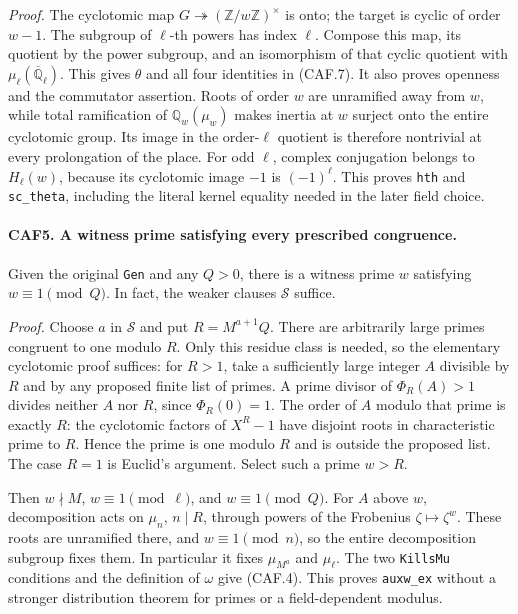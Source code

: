 \documentclass[11pt,a4paper]{article}
\numberwithin{equation}{section}
\theoremstyle{remark}\newtheorem{remark}[theorem]{Remark}
\begin{document}
\emph{Proof.}
The cyclotomic map \(G\twoheadrightarrow
(\mathbb Z/w\mathbb Z)^\times\) is onto; the target is cyclic of
order \(w-1\).  The subgroup of \(\ell\)-th powers has index
\(\ell\).  Compose this map, its quotient by the power subgroup,
and an isomorphism of that cyclic quotient with
\(\mu_\ell(\overline{\mathbb Q}_\ell)\).  This gives \(\theta\)
and all four identities in (CAF.7).  It also proves openness and
the commutator assertion.  Roots of order \(w\) are unramified away
from \(w\), while total ramification of
\(\mathbb Q_w(\mu_w)\) makes inertia at \(w\) surject onto the
entire cyclotomic group.  Its image in the order-\(\ell\) quotient
is therefore nontrivial at every prolongation of the place.  For odd
\(\ell\), complex conjugation belongs to \(H_\ell(w)\), because
its cyclotomic image \(-1\) is \((-1)^\ell\).
This proves \texttt{hth} and \texttt{sc\_\allowbreak theta}, including the
literal kernel equality needed in the later field choice.

\paragraph{CAF5. A witness prime satisfying every prescribed congruence.}
\label{claim:CAF5}
Given the original \texttt{Gen} and any \(Q>0\), there is a witness
prime \(w\) satisfying \(w\equiv1\pmod Q\).  In fact, the
weaker clauses \(\mathcal S\) suffice.

\emph{Proof.}
Choose \(a\) in \(\mathcal S\) and put \(R=M^{a+1}Q\).  There
are arbitrarily large primes congruent to one modulo \(R\).
Only this residue class is needed, so the elementary cyclotomic proof
suffices: for \(R>1\), take a sufficiently large integer \(A\)
divisible by \(R\)
and by any proposed finite list of primes.  A prime divisor of
\(\Phi_R(A)>1\) divides neither \(A\) nor \(R\), since
\(\Phi_R(0)=1\).  The order of \(A\) modulo that prime is exactly
\(R\): the cyclotomic factors of \(X^R-1\) have disjoint roots
in characteristic prime to \(R\).  Hence the prime is one modulo
\(R\) and is outside the proposed list.  The case \(R=1\) is
Euclid's argument.  Select such a prime \(w>R\).

Then \(w\nmid M\), \(w\equiv1\pmod\ell\), and
\(w\equiv1\pmod Q\).  For \(A\) above \(w\), decomposition
acts on \(\mu_n\), \(n\mid R\), through powers of the Frobenius
\(\zeta\mapsto\zeta^w\).  These roots are unramified there, and
\(w\equiv1\pmod n\), so the entire decomposition subgroup fixes
them.  In particular it fixes \(\mu_{M^a}\) and \(\mu_\ell\).
The two \texttt{Kills\allowbreak Mu} conditions and the definition of \(\omega\)
give (CAF.4).  This proves \texttt{auxw\_\allowbreak ex} without a stronger
distribution theorem for primes or a field-dependent modulus.
\end{document}
